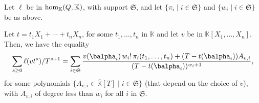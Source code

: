 \documentclass[12pt]{article}
\def\K {\ensuremath{\mathbb{K}}}
\def\Kbar {{\ensuremath{\overline{\mathbb{K}}}}}
\def\K{\mathbb{K}}
\begin{document}
\begin{lemma}\label{lemma:formula}
	Let $\ell$ be in ${\rm hom}_\K(Q,\K)$, with support $\mathfrak{S}$,
	and let $\{\pi_i \mid i \in \mathfrak{S}\}$ and $\{w_i \mid i \in
	\mathfrak{S}\}$ be as above.
	
	Let $t=t_1 X_1 + \cdots +t_n X_n$, for some $t_1,\dots,t_n$ in $\K$
	and let $v$ be in $\K[X_1,\dots,X_n]$. Then, we have the equality
	\begin{align}\label{eq:sumgenseries}
	\sum_{s \ge 0} \ell(v t^s)/T^{s+1} =
	\sum_{i \in \mathfrak{S}} \frac{
		v(\balpha_i)\, w_i!\, \pi_{i}(t_1,\dots,t_n)
		+ (T-t(\balpha_i))A_{v,i}}
	{(T-t(\balpha_i))^{w_{i}+1}},    
	\end{align}
	for some polynomials $\{A_{v,i} \in \Kbar[T] \mid i \in \mathfrak{S}\}$ (that
	depend on the choice of $v$), with $A_{v,i}$ of degree less than $w_i$ for all $i$ in
	$\mathfrak{S}$.
\end{lemma}
\end{document}
